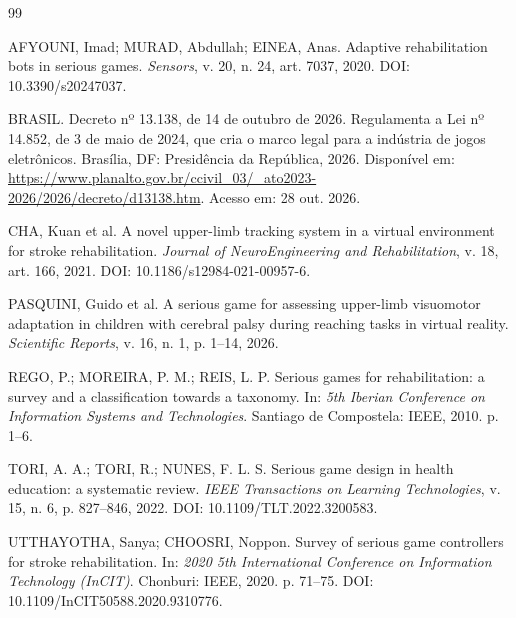 \documentclass[12pt]{article}
\begin{document}
\begin{thebibliography}{99}

AFYOUNI, Imad; MURAD, Abdullah; EINEA, Anas. Adaptive rehabilitation bots in serious games. \textit{Sensors}, v. 20, n. 24, art. 7037, 2020. DOI: 10.3390/s20247037.

BRASIL. Decreto nº 13.138, de 14 de outubro de 2026. Regulamenta a Lei nº 14.852, de 3 de maio de 2024, que cria o marco legal para a indústria de jogos eletrônicos. Brasília, DF: Presidência da República, 2026. Disponível em: \url{https://www.planalto.gov.br/ccivil_03/_ato2023-2026/2026/decreto/d13138.htm}. Acesso em: 28 out. 2026.

CHA, Kuan et al. A novel upper-limb tracking system in a virtual environment for stroke rehabilitation. \textit{Journal of NeuroEngineering and Rehabilitation}, v. 18, art. 166, 2021. DOI: 10.1186/s12984-021-00957-6.

PASQUINI, Guido et al. A serious game for assessing upper-limb visuomotor adaptation in children with cerebral palsy during reaching tasks in virtual reality. \textit{Scientific Reports}, v. 16, n. 1, p. 1--14, 2026.

REGO, P.; MOREIRA, P. M.; REIS, L. P. Serious games for rehabilitation: a survey and a classification towards a taxonomy. In: \textit{5th Iberian Conference on Information Systems and Technologies}. Santiago de Compostela: IEEE, 2010. p. 1--6.

TORI, A. A.; TORI, R.; NUNES, F. L. S. Serious game design in health education: a systematic review. \textit{IEEE Transactions on Learning Technologies}, v. 15, n. 6, p. 827--846, 2022. DOI: 10.1109/TLT.2022.3200583.

UTTHAYOTHA, Sanya; CHOOSRI, Noppon. Survey of serious game controllers for stroke rehabilitation. In: \textit{2020 5th International Conference on Information Technology (InCIT)}. Chonburi: IEEE, 2020. p. 71--75. DOI: 10.1109/InCIT50588.2020.9310776.

\end{thebibliography}
\end{document}

